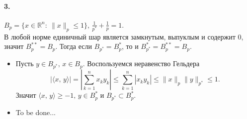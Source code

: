 \documentclass{article}
\newcommand*{\R}{\mathbb{R}}
\begin{document}
\paragraph{3.} $ B_p = \{ x \in \R^n :\: \|x\|_p \leqslant 1 \},\, \frac{1}{p^\ast} + \frac{1}{p} = 1. $ \\
В любой норме единичный шар является замкнутым, выпуклым и содержит 0, значит $B_p^{\ast\ast} = B_p$. Тогда если $B_{p^\ast} = B_p^\ast$, то и $B_{p^\ast}^\ast = B_p^{\ast\ast} = B_p$.
\begin{itemize}
    \item Пусть $y \in B_{p^\ast},\, x \in B_p$. Воспользуемся неравенство Гельдера
    \[ \left| \langle x,\, y \rangle \right| = \left| \sum_{k = 1}^n x_k y_k \right| \leqslant \sum_{k = 1}^n | x_k y_k | \leqslant \|x\|_p \|y\|_{p^\ast} \leqslant 1. \]
    Значит $ \langle x,\, y \rangle \geqslant -1,\, y \in B_p^\ast$ и $ B_{p^\ast} \subset B_p^\ast $. 
    \item To be done...
\end{itemize}
\end{document}
